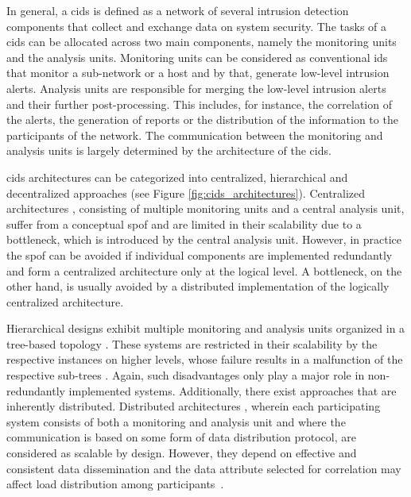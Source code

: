 

 In general, a \gls{cids} is defined as a network of several intrusion detection components that collect and exchange data on system security. The tasks of a \gls{cids} can be allocated across two main components, namely the monitoring units and the analysis units. Monitoring units can be considered as conventional \gls{ids} that monitor a sub-network or a host and by that, generate low-level intrusion alerts. Analysis units are responsible for merging the low-level intrusion alerts and their further post-processing. This includes, for instance, the correlation of the alerts, the generation of reports or the distribution of the information to the participants of the network. The communication between the monitoring and analysis units is largely determined by the architecture of the \gls{cids}.

 \gls{cids} architectures can be categorized into centralized, hierarchical and decentralized approaches \cite{Zhou2010} (see Figure \ref{fig:cids_architectures}). Centralized architectures \cite{Cuppens2002}\cite{Miller2003}, consisting of multiple monitoring units and a central analysis unit, suffer from a conceptual \gls{spof} and are limited in their scalability due to a bottleneck, which is introduced by the central analysis unit. However, in practice the \gls{spof} can be avoided if individual components are implemented redundantly and form a centralized architecture only at the logical level. A bottleneck, on the other hand, is usually avoided by a distributed implementation of the logically centralized architecture. 
 
 Hierarchical designs exhibit multiple monitoring and analysis units organized in a tree-based topology \cite{Phillip1997} \cite{Zhang2001} \cite{Nguyen2019}. These systems are restricted in their scalability by the respective instances on higher levels, whose failure results in a malfunction of the respective sub-trees \cite{Zhou2010}. Again, such disadvantages only play a major role in non-redundantly implemented systems. Additionally, there exist approaches that are inherently distributed. Distributed architectures \cite{Janakiraman2003} \cite{Fung2008} \cite{Vasilomanolakis2015SkipMon}, wherein each participating system consists of both a monitoring and analysis unit and where the communication is based on some form of data distribution protocol, are considered as scalable by design. However, they depend on effective and consistent data dissemination and the data attribute selected for correlation may affect load distribution among participants~\cite{Zhou2010}. 

